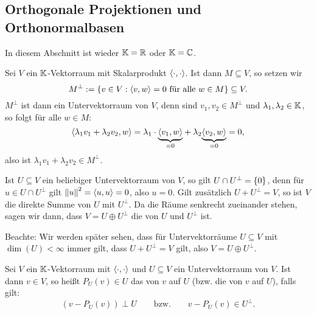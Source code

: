 \subsection{Orthogonale Projektionen und Orthonormalbasen}
\label{sec:2.4}

In diesem Abschnitt ist wieder $\mathbb{K} = \mathbb{R}$ oder $\mathbb{K}= \mathbb{C}$.

\begin{definition}
	\label{def:4.1}
	Sei $V$ ein $\mathbb{K}$-Vektorraum mit Skalarprodukt $\left\langle\cdot,\cdot\right\rangle$.
	Ist dann $M \subseteq V$, so setzen wir 
	\[
		M^\perp := \{v \in V : \left\langle v,w\right\rangle = 0 \text{ für alle } w \in M\} \subseteq V.
	\]
	$M^\perp$ ist dann ein Untervektorraum von $V$, denn sind $v_1,v_2 \in M^\perp$ und $\lambda_1,\lambda_2 \in \mathbb{K}$, so folgt für alle $w \in M$:
	\[
		\left\langle\lambda_1 v_1 + \lambda_2 v_2, w\right\rangle = \lambda_1 \cdot {\underbrace{\left\langle v_1,w\right\rangle}_{=0}} + \lambda_2 {\underbrace{\left\langle v_2,w\right\rangle}_{=0}} = 0,
	\]
	also ist $\lambda_1 v_1 + \lambda_2 v_2 \in M^\perp$.
\end{definition}

\begin{bemerkung}
	\label{bem:4.2}
	Ist $U \subseteq V$ ein beliebiger Untervektorraum von $V$, so gilt $U \cap U^\perp = \{0\}$, denn für $u \in U \cap U^\perp$ gilt $\left\lVert u\right\rVert^2 = \left\langle u,u\right\rangle = 0$, also $u = 0$.
	Gilt zusätzlich $U + U^\perp = V$, so ist $V$ die direkte Summe von $U$ mit $U^\perp$.
	Da die Räume senkrecht zueinander stehen, sagen wir dann, dass $V = U \oplus U^\perp$ die  von $U$ und $U^\perp$ ist.
	
	Beachte: Wir werden später sehen, dass für Untervektorräume $U \subseteq V$ mit $\dim(U) < \infty$ immer gilt, dass $U + U^\perp = V$ gilt, also $V = U \oplus U^\perp$.
\end{bemerkung}

\begin{definition}
	\label{def:4.3}
	Sei $V$ ein $\mathbb{K}$-Vektorraum mit $\left\langle\cdot,\cdot\right\rangle$ und $U \subseteq V$ ein Untervektorraum von $V$.
	Ist dann $v \in V$, so heißt $P_U(v) \in U$ das  von $v$ auf $U$ (bzw. die  von $v$ auf $U$), falls gilt:
	\[
	(v- P_U(v)) \perp U \qquad \text{bzw.} \qquad v-P_U(v) \in U^\perp.
	\]
\end{definition}

